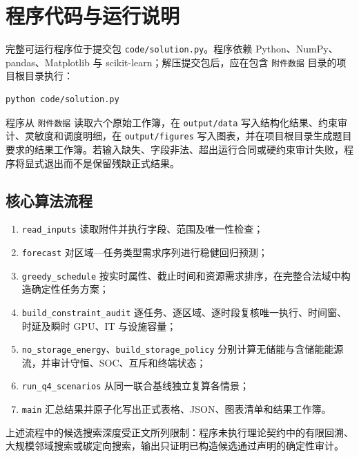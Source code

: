 \appendix
\section{程序代码与运行说明}

完整可运行程序位于提交包 \texttt{code/solution.py}。程序依赖 Python、NumPy、pandas、Matplotlib 与 scikit-learn；解压提交包后，应在包含 \texttt{附件数据} 目录的项目根目录执行：
\begin{verbatim}
python code/solution.py
\end{verbatim}
程序从 \texttt{附件数据} 读取六个原始工作簿，在 \texttt{output/data} 写入结构化结果、约束审计、灵敏度和调度明细，在 \texttt{output/figures} 写入图表，并在项目根目录生成题目要求的结果工作簿。若输入缺失、字段非法、超出运行合同或硬约束审计失败，程序将显式退出而不是保留残缺正式结果。

\subsection{核心算法流程}
\begin{enumerate}
\item \texttt{read\_inputs} 读取附件并执行字段、范围及唯一性检查；
\item \texttt{forecast} 对区域—任务类型需求序列进行稳健回归预测；
\item \texttt{greedy\_schedule} 按实时属性、截止时间和资源需求排序，在完整合法域中构造确定性任务方案；
\item \texttt{build\_constraint\_audit} 逐任务、逐区域、逐时段复核唯一执行、时间窗、时延及瞬时 GPU、IT 与设施容量；
\item \texttt{no\_storage\_energy}、\texttt{build\_storage\_policy} 分别计算无储能与含储能能源流，并审计守恒、SOC、互斥和终端状态；
\item \texttt{run\_q4\_scenarios} 从同一联合基线独立复算各情景；
\item \texttt{main} 汇总结果并原子化写出正式表格、JSON、图表清单和结果工作簿。
\end{enumerate}

上述流程中的候选搜索深度受正文所列限制：程序未执行理论契约中的有限回溯、大规模邻域搜索或碳定向搜索，输出只证明已构造候选通过声明的确定性审计。
